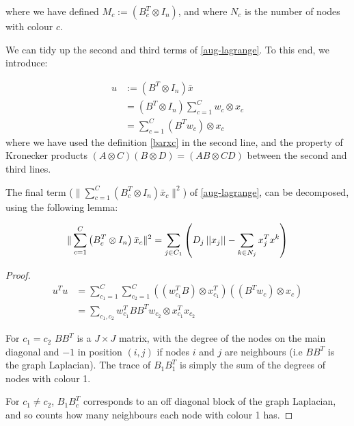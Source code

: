 \documentclass{article}
\begin{document}
where we have defined \(M_c := \left(B_c^T \otimes I_n\right)\), and where \(N_c\) is the number of nodes with colour \(c\).

We can tidy up the second and third terms of \eqref{aug-lagrange}. To this end, we introduce:

\begin{defn}
\begin{align*}
u &:= \left(B^T \otimes I_n\right)\bar{x} \\
& = \left(B^T \otimes I_n\right)\sum_{c=1}^C w_c \otimes x_c \\
& = \sum	_{c=1}^C \left(B^Tw_c\right) \otimes x_c
\end{align*}
where we have used the definition \eqref{barxc} in the second line, and the property of Kronecker products \((A\otimes C)(B \otimes D) = (AB \otimes CD)\) between the second and third lines.
\end{defn}

The final term (\(\|\sum_{c=1}^C\left(B_c^T \otimes I_n\right)\bar{x}_c\|^2\)) of \eqref{aug-lagrange}, can be decomposed, using the following lemma:

\begin{lemma}
\begin{equation}
\|\sum_{c=1}^C\left(B_c^T \otimes I_n\right)\bar{x}_c\|^2 = \sum_{j \in C_1}\left( D_j\left|\left|x_j\right|\right| - \sum_{k \in N_j} x_j^Tx^k\right)
\end{equation}
\begin{proof}

\begin{align*}
u^Tu &= \sum	_{c_1=1}^C \sum	_{c_2=1}^C  \left(\left(w_{c_1}^TB\right) \otimes x_{c_1}^T\right) \left(\left(B^Tw_c\right) \otimes x_c\right) \\
&= \sum_{c_1, c_2} w_{c_1}^TBB^Tw_{c_2} \otimes x_{c_1}^Tx_{c_2}
\end{align*}

For \(c_1 = c_2\) \(BB^T\) is a \(J \times J\) matrix, with the degree of the nodes on the main diagonal and \(-1\) in position \(\left(i,j\right)\) if nodes \(i\) and \(j\) are neighbours (i.e \(BB^T\) is the graph Laplacian). The trace of \(B_1B_1^T\) is simply the sum of the degrees of nodes with colour 1. 

For \(c_1 \neq c_2\),  \(B_1B_c^T\) corresponds to an off diagonal block of the graph Laplacian, and so counts how many neighbours each node with colour 1 has.
\end{proof}
\end{lemma}
\end{document}
